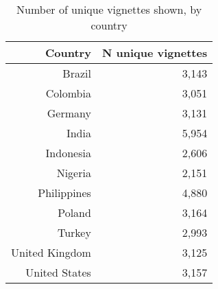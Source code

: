 \begin{table}[t!h]
\centering
\caption{Number of unique vignettes shown, by country\label{tab:unique-vignettes-by-country}} 
\begingroup\small
\begin{tabular}{rr}
  \toprule
Country & N unique vignettes \\ 
  \midrule
Brazil & 3,143 \\ 
  Colombia & 3,051 \\ 
  Germany & 3,131 \\ 
  India & 5,954 \\ 
  Indonesia & 2,606 \\ 
  Nigeria & 2,151 \\ 
  Philippines & 4,880 \\ 
  Poland & 3,164 \\ 
  Turkey & 2,993 \\ 
  United Kingdom & 3,125 \\ 
  United States & 3,157 \\ 
   \bottomrule
\end{tabular}
\endgroup
\end{table}
